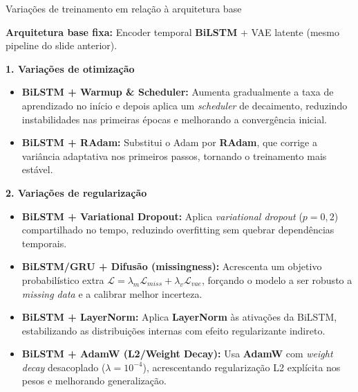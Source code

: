 \documentclass[10pt,aspectratio=169]{beamer}
\begin{document}
\begin{frame}{Variações de treinamento em relação à arquitetura base}
\small

\textbf{Arquitetura base fixa:} Encoder temporal \textbf{BiLSTM} + VAE latente  
(mesmo pipeline do slide anterior).

\vspace{0.3cm}

\textbf{1. Variações de otimização}
\begin{itemize}
  \item \textbf{BiLSTM + Warmup \& Scheduler:}  
        Aumenta gradualmente a taxa de aprendizado no início e depois aplica
        um \emph{scheduler} de decaimento, reduzindo instabilidades nas
        primeiras épocas e melhorando a convergência inicial.
  \item \textbf{BiLSTM + RAdam:}  
        Substitui o Adam por \textbf{RAdam}, que corrige a variância adaptativa
        nos primeiros passos, tornando o treinamento mais estável.
\end{itemize}

\vspace{0.3cm}

\textbf{2. Variações de regularização}
\begin{itemize}
  \item \textbf{BiLSTM + Variational Dropout:}  
        Aplica \emph{variational dropout} ($p=0{,}2$) compartilhado no tempo,
        reduzindo overfitting sem quebrar dependências temporais.
  \item \textbf{BiLSTM/GRU + Difusão (missingness):}  
        Acrescenta um objetivo probabilístico extra
        $\mathcal{L} = \lambda_m \mathcal{L}_{miss} + \lambda_v \mathcal{L}_{vae}$,
        forçando o modelo a ser robusto a \emph{missing data} e a calibrar melhor
        incerteza.
  \item \textbf{BiLSTM + LayerNorm:}  
        Aplica \textbf{LayerNorm} às ativações da BiLSTM, estabilizando as
        distribuições internas com efeito regularizante indireto.
 \item \textbf{BiLSTM + AdamW (L2/Weight Decay):}  
        Usa \textbf{AdamW} com \emph{weight decay} desacoplado
        ($\lambda = 10^{-4}$), acrescentando regularização L2 explícita
        nos pesos e melhorando generalização.
      \end{itemize}

\end{frame}

\end{document}
